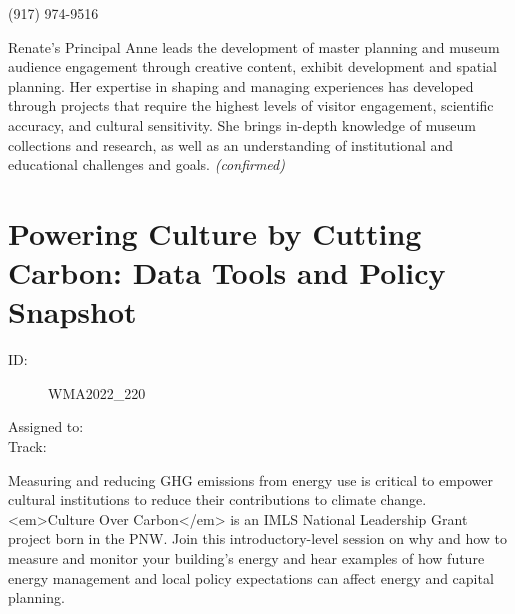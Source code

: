 \documentclass{report}
\begin{document}
                (917) 974-9516\newline

                Renate’s Principal Anne leads the development of master planning and museum audience engagement through creative content, exhibit development and spatial planning. Her expertise in shaping and managing experiences has developed through projects that require the highest levels of visitor engagement, scientific accuracy, and cultural sensitivity. She brings in-depth knowledge of museum collections and research, as well as an understanding of institutional and educational challenges and goals.
                \emph{ (confirmed) }
              

              
        
          \newpage
          \section{ Powering Culture by Cutting Carbon: Data Tools and Policy Snapshot }
            \begin{description}
              \item [ID:]
              WMA2022\_220

              \item [Assigned to:]
                \item [Track:]
              \end{description}

              Measuring and reducing GHG emissions from energy use is critical to empower cultural institutions to reduce their contributions to climate change. <em>Culture Over Carbon</em> is an IMLS National Leadership Grant project born in the PNW. Join this introductory-level session on why and how to measure and monitor your building’s energy and hear examples of how future energy management and local policy expectations can affect energy and capital planning.
\end{document}

